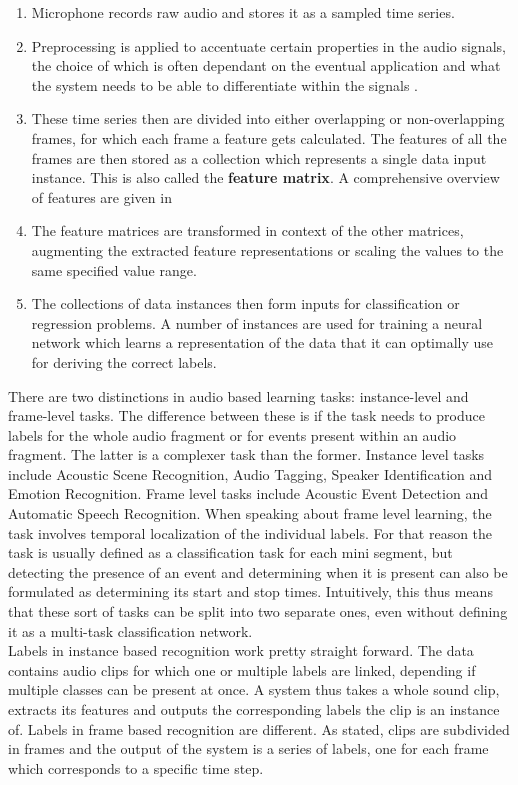 \begin{enumerate}
	\item Microphone records raw audio and stores it as a sampled time series. 
	\item Preprocessing is applied to accentuate certain properties in the audio signals, the choice of which is often dependant on the eventual application and what the system needs to be able to differentiate within the signals \citep{georgiev2017heterogeneous}. 
	\item These time series then are divided into either overlapping or non-overlapping frames, for which each frame a feature gets calculated. The features of all the frames are then stored as a collection which represents a single data input instance. This is also called the \textbf{feature matrix}. A comprehensive overview of features are given in \cite{mitrovic2010features}
	\item The feature matrices are transformed in context of the other matrices, augmenting the extracted feature representations or scaling the values to the same specified value range. 
	\item The collections of data instances then form inputs for classification or regression problems. A number of instances are used for training a neural network which learns a representation of the data that it can optimally use for deriving the correct labels.
\end{enumerate}

There are two distinctions in audio based learning tasks: instance-level and frame-level tasks. The difference between these is if the task needs to produce labels for the whole audio fragment or for events present within an audio fragment. The latter is a complexer task than the former.  Instance level tasks include Acoustic Scene Recognition, Audio Tagging, Speaker Identification and Emotion Recognition. Frame level tasks include Acoustic Event Detection and Automatic Speech Recognition. When speaking about frame level learning, the task involves temporal localization of the individual labels. For that reason the task is usually defined as a classification task for each mini segment, but detecting the presence of an event and determining when it is present can also be formulated as determining its start and stop times. Intuitively, this thus means that these sort of tasks can be split into two separate ones, even without defining it as a multi-task classification network. \\

Labels in instance based recognition work pretty straight forward. The data contains audio clips for which one or multiple labels are linked, depending if multiple classes can be present at once. A system thus takes a whole sound clip, extracts its features and outputs the corresponding labels the clip is an instance of. Labels in frame based recognition are different. As stated, clips are subdivided in frames and the output of the system is a series of labels, one for each frame which corresponds to a specific time step. \\

